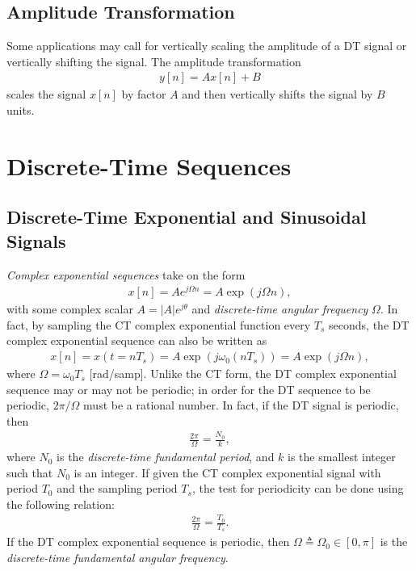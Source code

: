 \documentclass{report}
\begin{document}
\subsection{Amplitude Transformation}
Some applications may call for vertically scaling the amplitude of a DT signal or vertically shifting the signal. The amplitude transformation 
\begin{align}
    y[n] = Ax[n]+B
\end{align}
scales the signal $x[n]$ by factor $A$ and then vertically shifts the signal by $B$ units. 

\section{Discrete-Time Sequences}
\subsection{Discrete-Time Exponential and Sinusoidal Signals}
\emph{Complex exponential sequences} take on the form  
\begin{align}
    x[n] = Ae^{j\Omega n}=A\operatorname{exp}(j\Omega n),
\end{align}
with some complex scalar $A = |A|e^{j\theta}$ and \emph{discrete-time angular frequency} $\Omega$. In fact, by sampling the CT complex exponential function every $T_s$ seconds, 
the DT complex exponential sequence can also be written as 
\begin{align}
    x[n] = x(t=nT_s) = A\operatorname{exp}(j\omega_0 (nT_s)) = A\operatorname{exp}(j\Omega n),
\end{align}
where $\Omega = \omega_0 T_s$ [rad/samp]. Unlike the CT form, the DT complex exponential sequence may or may not be periodic; in order for the DT sequence to be periodic, 
$2\pi/\Omega$ must be a rational number. In fact, if the DT signal is periodic, then 
\begin{align}
    \frac{2\pi}{\Omega} = \frac{N_0}{k},
\end{align}
where $N_0$ is the \emph{discrete-time fundamental period}, and $k$ is the smallest integer such that $N_0$ is an integer. If given the CT complex exponential signal with period $T_0$ and the sampling period $T_s$, 
the test for periodicity can be done using the following relation:
\begin{align}
    \frac{2\pi}{\Omega} = \frac{T_0}{T_s}.
\end{align}
If the DT complex exponential sequence is periodic, then $\Omega \triangleq \Omega_0 \in [0,\pi]$ is the \emph{discrete-time fundamental angular frequency}. 
\end{document}
